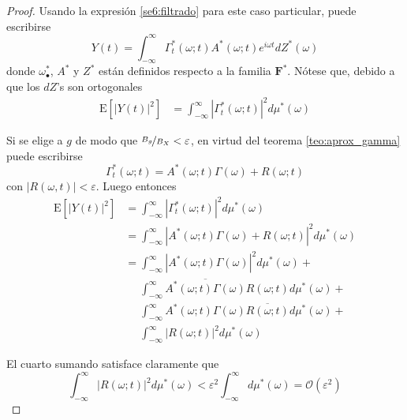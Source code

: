 \documentclass[12pt,letterpaper]{book}
\newcommand{\intR}{\int_{-\infty}^{\infty}}
\newcommand{\ef}{\mathbf{F}}
\newcommand{\efstar}{\ef^{\boldsymbol{*}}}
\newcommand{\E}[1]{\mathrm{E}\left[ #1 \right]}
\newcommand{\abso}[1]{\left| #1 \right|}
\newcommand{\orden}[1]{\mathcal{O}\left( #1 \right)}
\newcommand{\pheq}{\phantom{=}}
\begin{document}
\begin{proof}
Usando la expresión \ref{se6:filtrado} para este caso particular, puede escribirse
\begin{equation}
Y(t) = \intR \Gamma_t^{*} (\omega; t) A^{*}(\omega; t) e^{i \omega t} dZ^{*}(\omega)
\end{equation}
donde $\omega_\bullet^{*}$, $A^{*}$ y $Z^{*}$ están definidos respecto a la familia $\efstar$.
Nótese que, debido a que los $dZ$'s son ortogonales
\begin{align*}
\E{\abso{Y(t)}^{2}} 
&= \intR \abso{\Gamma_t^{*} (\omega; t)}^{2} d\mu^{*}(\omega)
\end{align*}

Si se elige a $g$ de modo que $\nicefrac{B_g}{B_X} < \varepsilon$, en virtud del teorema \ref{teo:aprox_gamma} puede escribirse
\begin{equation}
\Gamma_t^{*}(\omega; t) = A^{*}(\omega; t) \Gamma(\omega) + R(\omega; t)
\end{equation}
con $\abso{R(\omega,t)} < \varepsilon$. Luego entonces
\begin{align*}
\E{\abso{Y(t)}^{2}} 
&= 
\intR \abso{\Gamma_t^{*} (\omega; t)}^{2} d\mu^{*}(\omega) \\
&= 
\intR \abso{A^{*}(\omega; t) \Gamma(\omega) + R(\omega; t)}^{2} d\mu^{*}(\omega) \\
&= 
\intR \abso{A^{*}(\omega; t) \Gamma(\omega)}^{2} d\mu^{*}(\omega) +\\
&\pheq
\intR \overline{A^{*}(\omega; t) \Gamma(\omega)} R(\omega; t) d\mu^{*}(\omega) +\\
&\pheq
\intR A^{*}(\omega; t) \Gamma(\omega) \overline{ R(\omega; t)} d\mu^{*}(\omega) +\\
&\pheq
\intR \abso{R(\omega; t)}^{2} d\mu^{*}(\omega) 
\end{align*}

El cuarto sumando satisface claramente que
\begin{equation}
\intR \abso{R(\omega; t)}^{2} d\mu^{*}(\omega)  < \varepsilon^{2} \intR d\mu^{*}(\omega) 
= \orden{\varepsilon^{2}}
\end{equation}


\end{proof}
\end{document}
